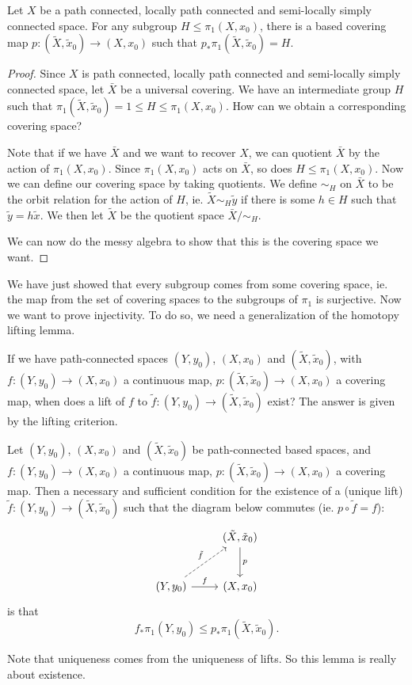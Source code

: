 \documentclass[a4paper]{article}
\begin{document}
\begin{prop}
  Let $X$ be a path connected, locally path connected and semi-locally simply connected space. For any subgroup $H \leq \pi_1(X, x_0)$, there is a based covering map $p: (\tilde{X}, \tilde{x}_0)\to (X, x_0)$ such that $p_* \pi_1(\tilde{X}, \tilde{x}_0) = H$.
\end{prop}

\begin{proof}
  Since $X$ is path connected, locally path connected and semi-locally simply connected space, let $\bar{X}$ be a universal covering. We have an intermediate group $H$ such that $\pi_1(\tilde{X}, \tilde{x}_0) = 1 \leq H \leq \pi_1(X, x_0)$. How can we obtain a corresponding covering space?

  Note that if we have $\bar{X}$ and we want to recover $X$, we can quotient $\bar{X}$ by the action of $\pi_1(X, x_0)$. Since $\pi_1(X, x_0)$ acts on $\bar{X}$, so does $H \leq \pi_1(X, x_0)$. Now we can define our covering space by taking quotients. We define $\sim_H$ on $\bar{X}$ to be the orbit relation for the action of $H$, ie. $\tilde{X} \sim_H \tilde{y}$ if there is some $h \in H$ such that $\tilde{y} = h\tilde{x}$. We then let $\tilde{X}$ be the quotient space $\bar{X}/{\sim_H}$.

  We can now do the messy algebra to show that this is the covering space we want.
\end{proof}
We have just showed that every subgroup comes from some covering space, ie. the map from the set of covering spaces to the subgroups of $\pi_1$ is surjective. Now we want to prove injectivity. To do so, we need a generalization of the homotopy lifting lemma.

If we have path-connected spaces $(Y, y_0)$, $(X, x_0)$ and $(\tilde{X}, \tilde{x}_0)$, with $f: (Y, y_0) \to (X, x_0)$ a continuous map, $p: (\tilde{X}, \tilde{x}_0) \to (X, x_0)$ a covering map, when does a lift of $f$ to $\tilde{f}: (Y, y_0) \to (\tilde{X}, \tilde{x}_0)$ exist? The answer is given by the lifting criterion.

\begin{lemma}
  Let $(Y, y_0)$, $(X, x_0)$ and $(\tilde{X}, \tilde{x}_0)$ be path-connected based spaces, and $f: (Y, y_0) \to (X, x_0)$ a continuous map, $p: (\tilde{X}, \tilde{x}_0) \to (X, x_0)$ a covering map. Then a necessary and sufficient condition for the existence of a (unique lift) $\tilde{f}: (Y, y_0) \to (\tilde{X}, \tilde{x}_0)$ such that the diagram below commutes (ie. $p\circ \tilde{f} = f$):
  \[
    \begin{tikzcd}[row sep=large]
      & (\tilde{X}, \tilde{x}_0) \ar[d, "p"]\\
      (Y, y_0) \ar [r, "f"] \ar [ru, dashed, "\tilde{f}"] & (X, x_0)
    \end{tikzcd}
  \]
  is that
  \[
    f_* \pi_1(Y, y_0) \leq p_*\pi_1(\tilde{X}, \tilde{x}_0).
  \]
\end{lemma}
Note that uniqueness comes from the uniqueness of lifts. So this lemma is really about existence.
\end{document}
